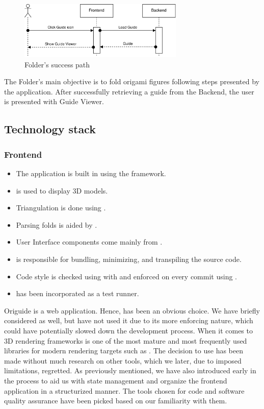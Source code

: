 \begin{figure}[H]
	\caption{Folder's success path}
  \centering
    \includegraphics[width=0.70\textwidth]{assets/3-folder-flow.png}
\end{figure}

The Folder's main objective is to fold origami figures following steps presented by the application. After successfully retrieving a guide from the Backend, the user is presented with Guide Viewer.

\subsection{Technology stack}

\subsubsection{Frontend}

\begin{itemize}
	\item The application is built in  using the  framework. 
	\item {} is used to display 3D models.
	\item Triangulation is done using . 
	\item Parsing folds is aided by .
	\item User Interface components come mainly from .
	\item {} is responsible for bundling, minimizing, and transpiling the source code.
	\item Code style is checked using  with  and enforced on every commit using .
	\item {} has been incorporated as a test runner.
\end{itemize}

Origuide is a web application. Hence,  has been an obvious choice. We have briefly considered  as well, but have not used it due to its more enforcing nature, which could have potentially slowed down the development process. When it comes to 3D rendering frameworks  is one of the most mature and most frequently used libraries for modern rendering targets such as . The decision to use  has been made without much research on other tools, which we later, due to imposed limitations, regretted. As previously mentioned, we have also introduced  early in the process to aid us with state management and organize the frontend application in a structurized manner. The tools chosen for code and software quality assurance have been picked based on our familiarity with them.



